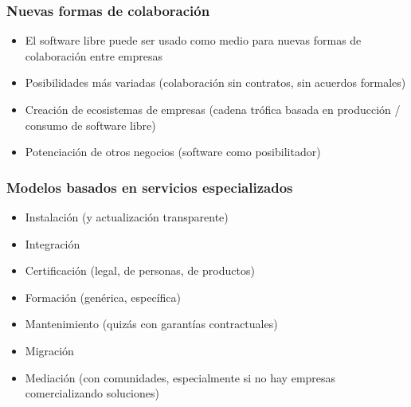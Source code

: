 
\begin{frame}
\frametitle{Nuevas formas de colaboración}

\begin{itemize}
\item El software libre puede ser usado como medio para nuevas formas
  de colaboración entre empresas
\item Posibilidades más variadas (colaboración sin contratos, sin
  acuerdos formales)
\item Creación de ecosistemas de empresas (cadena trófica basada en
  producción / consumo de software libre)
\item Potenciación de otros negocios (software como posibilitador)
\end{itemize}

\end{frame}


\begin{frame}
\frametitle{Modelos basados en servicios especializados}

\begin{itemize}
\item Instalación (y actualización transparente)
\item Integración
\item Certificación (legal, de personas, de productos)
\item Formación (genérica, específica)
\item Mantenimiento (quizás con garantías contractuales)
\item Migración
\item Mediación (con comunidades, especialmente si no hay empresas
  comercializando soluciones)
\end{itemize}
\end{frame}



